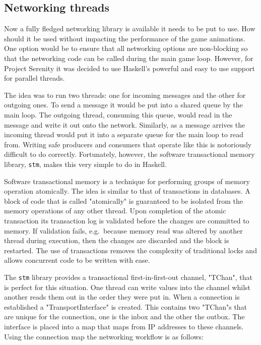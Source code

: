
%

\subsection{Networking threads}


Now a fully fledged networking library is available it needs to be put to use. How should it
be used without impacting the performance of the game animations. One option would be to
ensure that all networking options are non-blocking so that the networking code can be called
during the main game loop. However, for Project Serenity it was decided to use Haskell's
powerful and easy to use support for parallel threads.

The idea was to run two threads: one for incoming messages and the other for outgoing ones.
To send a message it would be put into a shared queue by the main loop. The outgoing thread,
consuming this queue, would read in the message and write it out onto the network. Similarly,
as a message arrives the incoming thread would put it into a separate queue for the main loop
to read from. Writing safe producers and consumers that operate like this is notoriously difficult
to do correctly. Fortunately, however, the software transactional memory library, \texttt{stm},
makes this very simple to do in Haskell.

Software transactional memory is a technique for performing groups of memory operation atomically.\cite{stm}
The idea is similar to that of transactions in databases. A block of code that is called "atomically"
is guaranteed to be isolated from the memory operations of any other thread. Upon completion of the atomic
transaction its transaction log is validated before the changes are committed to memory. If validation
fails, e.g.\ because memory read was altered by another thread during execution, then the changes are
discarded and the block is restarted. The use of transactions removes the complexity of traditional
locks and allows concurrent code to be written with ease.

The \texttt{stm} library provides a transactional first-in-first-out channel, "TChan", that is
perfect for this situation. One thread can write values into the channel whilst another reads
them out in the order they were put in. When a connection is established a "TransportInterface"
is created. This contains two "TChan"s that are unique for the connection, one is the inbox and
the other the outbox. The interface is placed into a map that maps from IP addresses to these
channels. Using the connection map the networking workflow is as follows:


